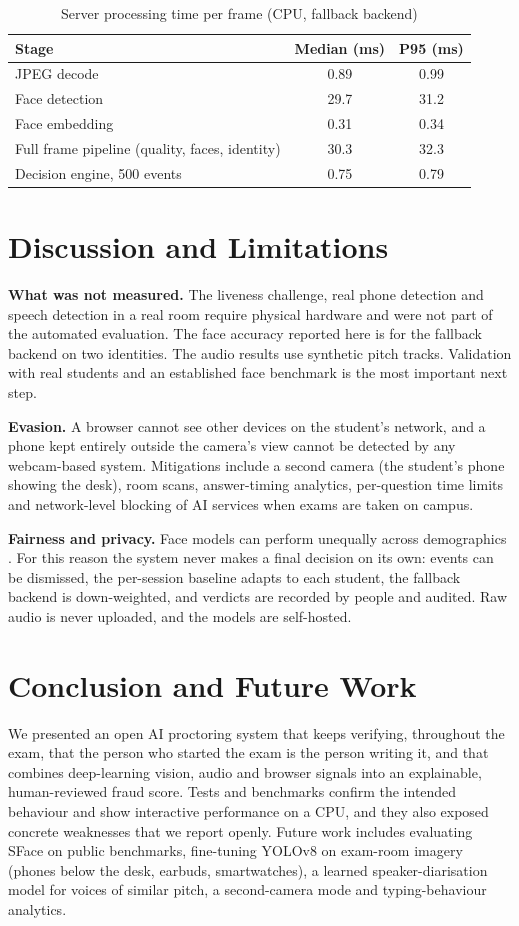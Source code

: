 \documentclass[conference]{IEEEtran}
\begin{document}
\begin{table}[t]
\caption{Server processing time per frame (CPU, fallback backend)}
\label{tab:latency}
\centering
\footnotesize
\begin{tabular}{@{}lcc@{}}
\toprule
\textbf{Stage} & \textbf{Median (ms)} & \textbf{P95 (ms)} \\
\midrule
JPEG decode & 0.89 & 0.99 \\
Face detection & 29.7 & 31.2 \\
Face embedding & 0.31 & 0.34 \\
Full frame pipeline (quality, faces, identity) & 30.3 & 32.3 \\
Decision engine, 500 events & 0.75 & 0.79 \\
\bottomrule
\end{tabular}
\end{table}

\section{Discussion and Limitations}
\textbf{What was not measured.} The liveness challenge, real phone detection and speech detection in a real room require physical hardware and were not part of the automated evaluation. The face accuracy reported here is for the fallback backend on two identities. The audio results use synthetic pitch tracks. Validation with real students and an established face benchmark is the most important next step.

\textbf{Evasion.} A browser cannot see other devices on the student's network, and a phone kept entirely outside the camera's view cannot be detected by any webcam-based system. Mitigations include a second camera (the student's phone showing the desk), room scans, answer-timing analytics, per-question time limits and network-level blocking of AI services when exams are taken on campus.

\textbf{Fairness and privacy.} Face models can perform unequally across demographics \cite{coghlan2021ethics}. For this reason the system never makes a final decision on its own: events can be dismissed, the per-session baseline adapts to each student, the fallback backend is down-weighted, and verdicts are recorded by people and audited. Raw audio is never uploaded, and the models are self-hosted.

\section{Conclusion and Future Work}
We presented an open AI proctoring system that keeps verifying, throughout the exam, that the person who started the exam is the person writing it, and that combines deep-learning vision, audio and browser signals into an explainable, human-reviewed fraud score. Tests and benchmarks confirm the intended behaviour and show interactive performance on a CPU, and they also exposed concrete weaknesses that we report openly. Future work includes evaluating SFace on public benchmarks, fine-tuning YOLOv8 on exam-room imagery (phones below the desk, earbuds, smartwatches), a learned speaker-diarisation model for voices of similar pitch, a second-camera mode and typing-behaviour analytics.
\end{document}

